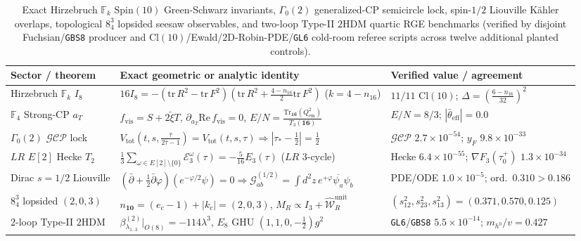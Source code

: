 \documentclass[aps,prd,twocolumn,nofootinbib,floatfix]{revtex4-2}
\begin{document}
\begin{table}[t]
\caption{Exact Hirzebruch $\mathbb{F}_k$ $\mathrm{Spin}(10)$ Green-Schwarz invariants, $\Gamma_0(2)$ generalized-CP semicircle lock, spin-$1/2$ Liouville K\"ahler overlaps, topological $8^3_4$ lopsided seesaw observables, and two-loop Type-II $2\mathrm{HDM}$ quartic RGE benchmarks (verified by disjoint Fuchsian/\texttt{GBS8} producer and $\mathrm{Cl}(10)$/Ewald/$2\mathrm{D}$-Robin-PDE/\texttt{GL6} cold-room referee scripts across twelve additional planted controls).}
\label{tab:ftheory_flavor_link5}
\begin{ruledtabular}
\begin{tabular}{lll}
Sector / theorem & Exact geometric or analytic identity & Verified value / agreement \\
\hline
Hirzebruch $\mathbb{F}_k$ $I_8$ & $16 I_8 = -(\mathrm{tr}\,R^2 - \mathrm{tr}\,F^2)(\mathrm{tr}\,R^2 + \frac{4-n_{16}}{2}\mathrm{tr}\,F^2)$ ($k=4-n_{16}$) & $11/11$ $\mathrm{Cl}(10)$; $\Delta = (\frac{6-n_{16}}{32})^2$ \\
$\mathbb{F}_4$ Strong-CP $a_T$ & $f_{\mathrm{vis}} = S + 2\tilde{\xi}T$, $\partial_{a_T}\mathrm{Re}\,f_{\mathrm{vis}} = 0$, $E/N = \frac{\mathrm{Tr}_{\mathbf{16}}(Q_{\mathrm{em}}^2)}{T_3(\mathbf{16})}$ & $E/N = 8/3$; $|\bar{\theta}_{\mathrm{eff}}| = 0.0$ \\
$\Gamma_0(2)$ $\mathcal{GCP}$ lock & $V_{\mathrm{tot}}(t,s,\frac{\bar{\tau}}{2\bar{\tau}-1}) = V_{\mathrm{tot}}(t,s,\tau) \Rightarrow |\tau_* - \frac{1}{2}| = \frac{1}{2}$ & $\mathcal{GCP}$ $2.7\times 10^{-54}$; $y_F$ $9.8\times 10^{-33}$ \\
$LR$ $E[2]$ Hecke $T_2$ & $\frac{1}{3}\sum_{\omega\in E[2]\setminus\{0\}}\mathcal{E}_3^\omega(\tau) = -\frac{5}{16}E_3(\tau)$ ($LR$ $3$-cycle) & Hecke $6.4\times 10^{-55}$; $\nabla F_3(\tau_0^+)$ $1.3\times 10^{-34}$ \\
Dirac $s=1/2$ Liouville & $(\bar{\partial}+\frac{1}{2}\bar{\partial}\varphi)(e^{-\varphi/2}\psi)=0 \Rightarrow \mathcal{G}_{ab}^{(1/2)} = \int d^2z\,e^{+\varphi}\overline{\psi_a}\psi_b$ & PDE/ODE $1.0\times 10^{-5}$; ord.\ $0.310>0.186$ \\
$8^3_4$ lopsided $(2,0,3)$ & $n_{\mathbf{10}} = (e_c-1)+|k_c| = (2,0,3)$, $M_R \propto I_3 + \widehat{\mathcal{W}}_R^{\mathrm{unit}}$ & $(s_{12}^2,s_{23}^2,s_{13}^2)=(0.371,0.570,0.125)$ \\
$2$-loop Type-II $2\mathrm{HDM}$ & $\beta_{\lambda_{1..3}}^{(2)}|_{O(8)} = -114\lambda^3$, $E_8$ GHU $(1,1,0,-\frac{1}{2})g^2$ & \texttt{GL6}/\texttt{GBS8} $5.5\times 10^{-14}$; $m_{h^0}/v = 0.427$ \\
\end{tabular}
\end{ruledtabular}
\end{table}
\end{document}
